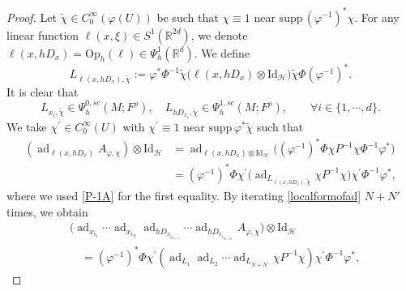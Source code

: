 \documentclass[11pt,oneside,reqno]{amsart}
\newcommand\R{\ensuremath{\mathbb{R}}}
\newcommand\Oph{\ensuremath{\mathrm{Op}_h}}
\theoremstyle{definition}
\numberwithin{equation}{section}
\theoremstyle{plain}
\begin{document}
\begin{proof}
Let $\widetilde{\chi} \in C_{0}^{\infty}(\varphi(U))$ be such that $\chi \equiv 1$ near $\mathrm{supp}\,(\varphi^{-1})^*\chi$. For any linear function $\ell(x,\xi) \in S^{1}(\R^{2d})$, we denote $\ell(x,hD_{x})=\Oph(\ell) \in \Psi^{1}_{h}(\mathbb{R}^d)$. We define 
\begin{equation*}\label{linearsymbol}
L_{\ell(x,hD_{x}),\widetilde{\chi}}:=\varphi^*\Phi^{-1}\widetilde{\chi} \big(\ell(x,hD_{x})\otimes \mathrm{Id}_{\mathcal{H}} \big) \widetilde{\chi}\Phi(\varphi^{-1})^* .
\end{equation*}
It is clear that
\begin{equation}\label{proL}
    L_{x_{i},\widetilde{\chi}}\in \Psi^{0,sc}_{h}(M;F^\rho),\quad L_{hD_{x_i},\widetilde{\chi}}\in \Psi^{1,sc}_{h}(M;F^\rho), \qquad \forall i\in \{1,\cdots,d\}.
\end{equation}
We take $\chi^{\prime}\in C_{0}^{\infty}(U)$ with $\chi^{\prime}\equiv 1$ near $\mathrm{supp}\,\varphi^*\widetilde{\chi}$ such that
\begin{equation}\label{localformofad}
\begin{aligned}
 (\operatorname{ad}_{\ell(x, h D_x)}A_{\varphi,\chi} )\otimes \mathrm{Id}_{\mathcal{H}}
&=\operatorname{ad}_{\ell(x, h D_x)\otimes \mathrm{Id}_{\mathcal{H}}}\big( (\varphi^{-1})^{*}\Phi\chi P^{-1}\chi\Phi^{-1}\varphi^{*} \big)\\
&=(\varphi^{-1})^{*}\Phi\chi^{\prime} \big(\operatorname{ad}_{L_{\ell(x,hD_{x}),\widetilde{\chi}}}\chi P^{-1}\chi \big)\chi^{\prime}\Phi^{-1}\varphi^{*},
\end{aligned}
\end{equation}
where we used \eqref{P-1A} for the first equality. By iterating \eqref{localformofad} $N+N'$ times, we obtain
\begin{equation}\label{adA435}
\begin{aligned}
&\big(\operatorname{ad}_{x_{i_1}} \cdots \operatorname{ad}_{x_{i_N}} \operatorname{ad}_{hD_{x_{i_{N+1}}}} \cdots \operatorname{ad}_{hD_{x_{i_{N+N^\prime}}}} A_{\varphi,\chi}\big)\otimes\mathrm{Id}_{\mathcal{H}}\\
&\quad =(\varphi^{-1})^{*}\Phi\chi^{\prime}(\operatorname{ad}_{L_{1}}\operatorname{ad}_{L_{2}}\cdots\operatorname{ad}_{L_{N+N^{\prime}}}\chi P^{-1}\chi)\chi^{\prime}\Phi^{-1}\varphi^{*},

\end{aligned}
\end{equation}
\end{proof}
\end{document}
